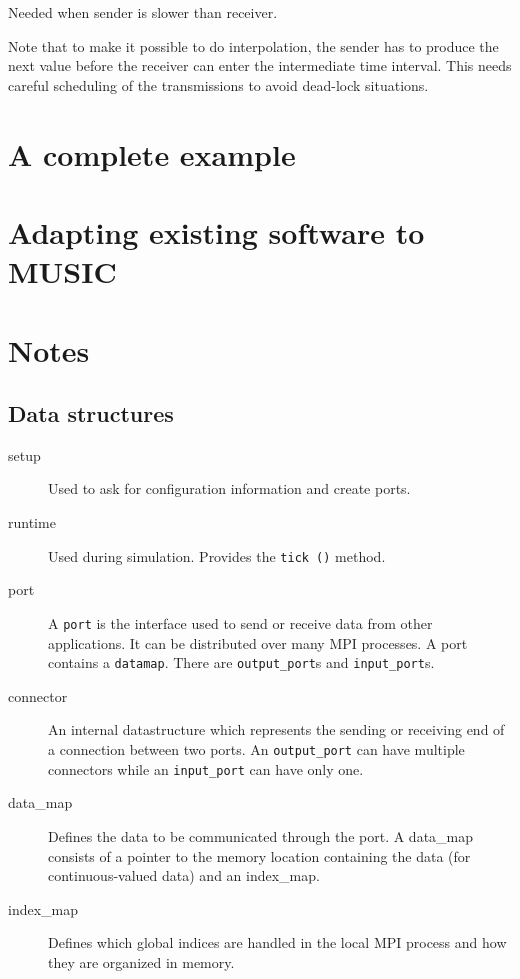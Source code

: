 \documentclass[a4paper]{report}
\begin{document}
Needed when sender is slower than receiver.

Note that to make it possible to do interpolation, the sender has to
produce the next value before the receiver can enter the intermediate
time interval.  This needs careful scheduling of the transmissions to
avoid dead-lock situations.

\chapter{A complete example}

\chapter{Adapting existing software to MUSIC}

\chapter{Notes}

\section{Data structures}

\begin{description}
  \item[setup] Used to ask for configuration information and create
    ports.
  \item[runtime] Used during simulation.  Provides the \verb|tick ()|
    method.
  \item[port] A \verb|port| is the interface used to send or receive
    data from other applications.  It can be distributed over many MPI
    processes.  A port contains a \verb|datamap|.  There are
    \verb|output_port|s and \verb|input_port|s.
  \item[connector] An internal datastructure which represents the
    sending or receiving end of a connection between two ports.  An
    \verb|output_port| can have multiple connectors while an
    \verb|input_port| can have only one.
  \item[data\_map] Defines the data to be communicated through the
    port.  A data\_map consists of a pointer to the memory location
    containing the data (for continuous-valued data) and an
    index\_map.
  \item[index\_map] Defines which global indices are handled in the
    local MPI process and how they are organized in memory.
\end{description}
\end{document}
